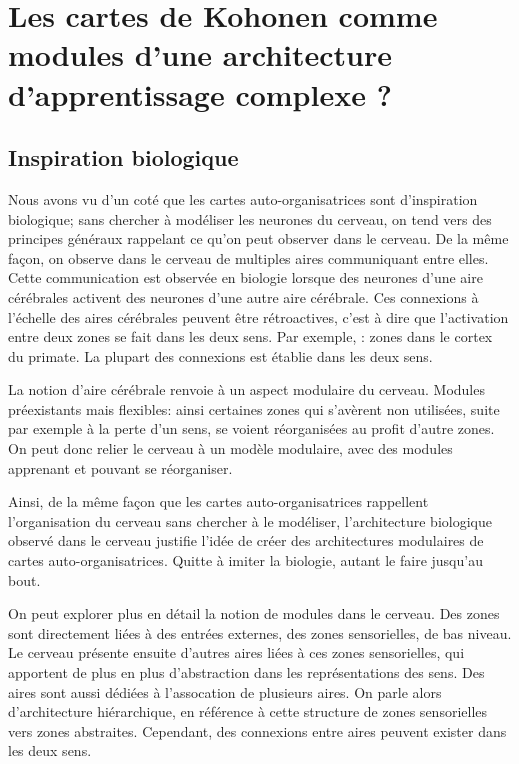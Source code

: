 \section{Les cartes de Kohonen comme modules d'une architecture d'apprentissage complexe ? }

\subsection{Inspiration biologique}
Nous avons vu d'un coté que les cartes auto-organisatrices sont d'inspiration biologique; sans chercher à modéliser les neurones du cerveau, on tend vers des principes généraux rappelant ce qu'on peut observer dans le cerveau. De la même façon, on observe dans le cerveau de multiples aires communiquant entre elles. Cette communication est observée en biologie lorsque des neurones d'une aire cérébrales activent des neurones d'une autre aire cérébrale. 
Ces connexions à l'échelle des aires cérébrales peuvent être rétroactives, c'est à dire que l'activation entre deux zones se fait dans les deux sens. Par exemple, \cite{primate_cortex_91}: zones dans le cortex du primate. La plupart des connexions est établie dans les deux sens.

La notion d'aire cérébrale renvoie à un aspect modulaire du cerveau. Modules préexistants mais flexibles: ainsi certaines zones qui s'avèrent non utilisées, suite par exemple à la perte d'un sens, se voient réorganisées au profit d'autre zones. On peut donc relier le cerveau à un modèle modulaire, avec des modules apprenant et pouvant se réorganiser.

Ainsi, de la même façon que les cartes auto-organisatrices rappellent l'organisation du cerveau sans chercher à le modéliser, l'architecture biologique observé dans le cerveau justifie l'idée de créer des architectures modulaires de cartes auto-organisatrices. Quitte à imiter la biologie, autant le faire jusqu'au bout.

On peut explorer plus en détail la notion de modules dans le cerveau. Des zones sont directement liées à des entrées externes, des zones sensorielles, de bas niveau. Le cerveau présente ensuite  d'autres aires liées à ces zones sensorielles, qui apportent de plus en plus d'abstraction dans les représentations des sens. Des aires sont aussi dédiées à l'assocation de plusieurs aires. On parle alors d'architecture hiérarchique, en référence à cette structure de zones sensorielles vers zones abstraites. Cependant, des connexions entre aires peuvent exister dans les deux sens. 

